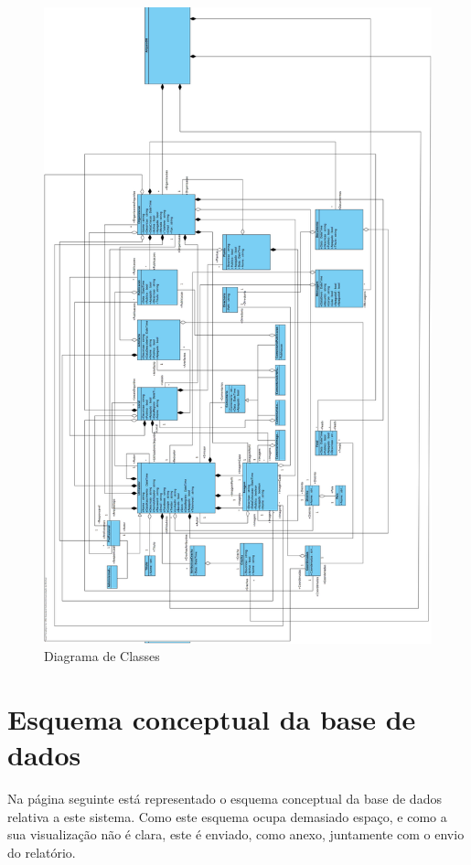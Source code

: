 \documentclass[12pt,a4paper]{article}
\begin{document}
\begin{figure}[h!]
\centering
\includegraphics[scale=0.2]{classes}
\caption{Diagrama de Classes} 
\end{figure} 

\clearpage
\section{Esquema conceptual da base de dados}
Na página seguinte está representado o esquema conceptual da base de dados relativa a este sistema. Como este esquema ocupa demasiado espaço, e como  a sua visualização não é clara, este é enviado, como anexo, juntamente com o envio do relatório.\\
\end{document}
